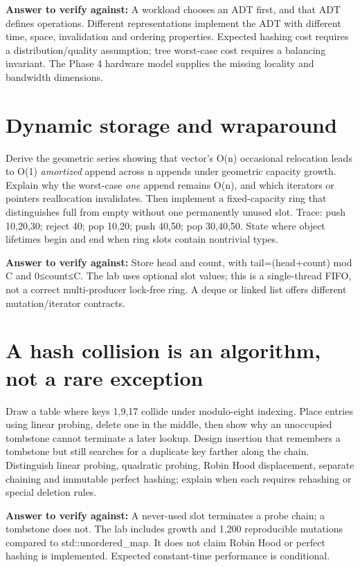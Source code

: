 \textbf{Answer to verify against:} A workload chooses an ADT first, and that ADT defines operations. Different representations implement the ADT with different time, space, invalidation and ordering properties. Expected hashing cost requires a distribution/quality assumption; tree worst-case cost requires a balancing invariant. The Phase 4 hardware model supplies the missing locality and bandwidth dimensions.

\section{Dynamic storage and wraparound}\label{appendix-8a046b38375e-dynamic-storage-and-wraparound}

Derive the geometric series showing that vector's O(n) occasional relocation leads to O(1) \emph{amortized} append across n appends under geometric capacity growth. Explain why the worst-case \emph{one} append remains O(n), and which iterators or pointers reallocation invalidates. Then implement a fixed-capacity ring that distinguishes full from empty without one permanently unused slot. Trace: push 10,20,30; reject 40; pop 10,20; push 40,50; pop 30,40,50. State where object lifetimes begin and end when ring slots contain nontrivial types.

\textbf{Answer to verify against:} Store head and count, with tail=(head+count) mod C and 0≤count≤C. The lab uses optional slot values; this is a single-thread FIFO, not a correct multi-producer lock-free ring. A deque or linked list offers different mutation/iterator contracts.

\section{A hash collision is an algorithm, not a rare exception}\label{appendix-8a046b38375e-a-hash-collision-is-an-algorithm-not-a-rare-exception}

Draw a table where keys 1,9,17 collide under modulo-eight indexing. Place entries using linear probing, delete one in the middle, then show why an unoccupied tombstone cannot terminate a later lookup. Design insertion that remembers a tombstone but still searches for a duplicate key farther along the chain. Distinguish linear probing, quadratic probing, Robin Hood displacement, separate chaining and immutable perfect hashing; explain when each requires rehashing or special deletion rules.

\textbf{Answer to verify against:} A never-used slot terminates a probe chain; a tombstone does not. The lab includes growth and 1,200 reproducible mutations compared to std::unordered\_map. It does not claim Robin Hood or perfect hashing is implemented. Expected constant-time performance is conditional.

